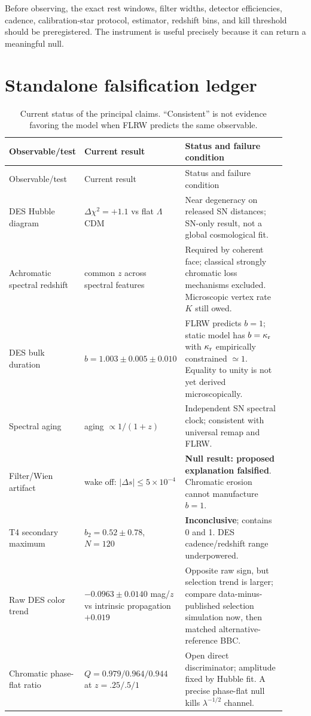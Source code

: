 \documentclass[11pt]{article}
\newcommand{\LCDM}{$\Lambda$CDM}
\newcommand{\kreact}{\kappa_{\rm r}}
\begin{document}
Before observing, the exact rest windows, filter widths, detector efficiencies, cadence, calibration-star protocol, estimator, redshift bins, and kill threshold should be preregistered. The instrument is useful precisely because it can return a meaningful null.

\section{Standalone falsification ledger}
\small
\begin{longtable}{p{0.20\linewidth}p{0.25\linewidth}p{0.47\linewidth}}
\caption{Current status of the principal claims. ``Consistent'' is not evidence favoring the model when FLRW predicts the same observable.}\label{tab:ledger}\\
\toprule
Observable/test & Current result & Status and failure condition\\
\midrule
\endfirsthead
\toprule
Observable/test & Current result & Status and failure condition\\
\midrule
\endhead
DES Hubble diagram & $\Delta\chi^2=+1.1$ vs flat \LCDM & Near degeneracy on released SN distances; SN-only result, not a global cosmological fit.\\
Achromatic spectral redshift & common $z$ across spectral features & Required by coherent face; classical strongly chromatic loss mechanisms excluded. Microscopic vertex rate $K$ still owed.\\
DES bulk duration & $b=1.003\pm0.005\pm0.010$ & FLRW predicts $b=1$; static model has $b=\kreact$ with $\kreact$ empirically constrained $\simeq1$. Equality to unity is not yet derived microscopically.\\
Spectral aging & aging $\propto1/(1+z)$ & Independent SN spectral clock; consistent with universal remap and FLRW.\\
Filter/Wien artifact & wake off: $|\Delta s|\le5\times10^{-4}$ & \textbf{Null result: proposed explanation falsified}. Chromatic erosion cannot manufacture $b=1$.\\
T4 secondary maximum & $b_2=0.52\pm0.78$, $N=120$ & \textbf{Inconclusive}; contains 0 and 1. DES cadence/redshift range underpowered.\\
Raw DES color trend & $-0.0963\pm0.0140$ mag/$z$ vs intrinsic propagation $+0.019$ & Opposite raw sign, but selection trend is larger; compare data-minus-published selection simulation now, then matched alternative-reference BBC.\\
Chromatic phase-flat ratio & $Q=0.979/0.964/0.944$ at $z=.25/.5/1$ & Open direct discriminator; amplitude fixed by Hubble fit. A precise phase-flat null kills $\lambda^{-1/2}$ channel.\\

\end{longtable}
\end{document}

